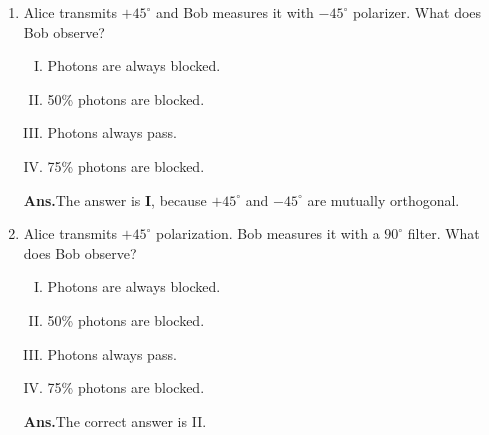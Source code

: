 \documentclass[12pt]{article}
\newcommand\tbf[1]{\textbf{#1}}
\newcommand\ta{\tbf{Alice: }}
\newcommand\tp{\tbf{Prof.: }}
\newcommand\tans{\tbf{Ans.}}
\begin{document}
\begin{enumerate}[1.]
\vspace{1cm}
\ta Now let {Eve} (the culprit) eavesdrops over your conversation. Now, by intercepting each photon sent by you, she can certainly know which photon you have sent? And then she can just relay the same photon over to Bob, so that none of you can ever anticipate that you are being watched. \newline
\ta Oh my goodness! Then what can I do to prevent this? \newline
\tp Wait. We shall need to use two non-orthogonal basis if we have to know if someone is eavesdropping. \newline
\ta Now how is that? \newline
\tp Okay, then read this up! \newline
\begin{center}
[Hands over a copy of Bennett (1991) Phys. Rev. Vol. 68 No. 21]
\end{center}
Alice sends photons of $+45^\circ$ polarization and horizontal ($0^\circ$) polarization. Bob measures them with $-45^\circ$ and vertical ($90^\circ$). Every time Bob gets a photon, he notifies Alice, and they decide to call $+45^\circ$ bit 1 and $0^\circ$ as bit 0. \newline
\item Alice transmits $+45^\circ$ and Bob measures it with $-45^\circ$ polarizer. What does Bob observe?
\begin{enumerate}[I.]
\item Photons are always blocked.
\item 50\% photons are blocked.
\item Photons always pass.
\item 75\% photons are blocked. \newline
\end{enumerate}
\tans The answer is \tbf{I}, because $+45^\circ$ and $-45^\circ$ are mutually orthogonal.
\item Alice transmits $+45^\circ$ polarization. Bob measures it with a $90^\circ$ filter. What does Bob observe?
\begin{enumerate}[I.]
\item Photons are always blocked.
\item 50\% photons are blocked.
\item Photons always pass.
\item 75\% photons are blocked. \newline
\end{enumerate}
\tans The correct answer is II.

\end{enumerate}
\end{document}
